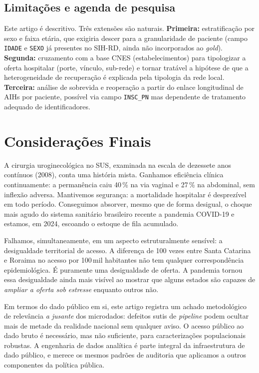 \documentclass[12pt,a4paper,oneside]{article}
\begin{document}
\subsection{Limitações e agenda de pesquisa}

Este artigo é descritivo. Três extensões são naturais.
\textbf{Primeira:} estratificação por sexo e faixa etária, que
exigiria descer para a granularidade de paciente (campo
\texttt{IDADE} e \texttt{SEXO} já presentes no SIH-RD, ainda
não incorporados ao \textit{gold}).
\textbf{Segunda:} cruzamento com a base CNES (estabelecimentos)
para tipologizar a oferta hospitalar (porte, vínculo, sub-rede)
e tornar tratável a hipótese de que a heterogeneidade de
recuperação é explicada pela tipologia da rede local.
\textbf{Terceira:} análise de sobrevida e reoperação a partir
do enlace longitudinal de AIHs por paciente, possível via
campo \texttt{INSC\_PN} mas dependente de tratamento adequado de
identificadores.

\section{Considerações Finais}\label{sec:conclusao}

A cirurgia uroginecológica no SUS, examinada na escala de
dezessete anos contínuos (2008), conta uma
história mista.
Ganhamos eficiência clínica continuamente: a permanência caiu
40\,\% na via vaginal e 27\,\% na abdominal, sem inflexão
adversa. Mantivemos segurança: a mortalidade hospitalar é
desprezível em todo período. Conseguimos absorver, mesmo que de
forma desigual, o choque mais agudo do sistema sanitário
brasileiro recente \textemdash{} a pandemia COVID-19 \textemdash{}
e estamos, em 2024, escoando o estoque de fila
acumulado.

Falhamos, simultaneamente, em um aspecto estruturalmente sensível:
a desigualdade territorial de acesso. A diferença de 100 vezes
entre Santa Catarina e Roraima no acesso por 100\,mil habitantes
não tem qualquer correspondência epidemiológica. É puramente
uma desigualdade de oferta. A pandemia tornou essa desigualdade
ainda mais visível ao mostrar que alguns estados são capazes de
\textit{ampliar a oferta sob estresse} enquanto outros não.

Em termos do dado público em si, este artigo registra um achado
metodológico de relevância \textit{a jusante} dos microdados:
defeitos sutis de \textit{pipeline} podem ocultar mais de
metade da realidade nacional sem qualquer aviso. O acesso público
ao dado bruto é necessário, mas não suficiente, para
caracterizações populacionais robustas. A engenharia de dados
analítica é parte integral da infraestrutura de dado público,
e merece os mesmos padrões de auditoria que aplicamos a outros
componentes da política pública.
\end{document}
